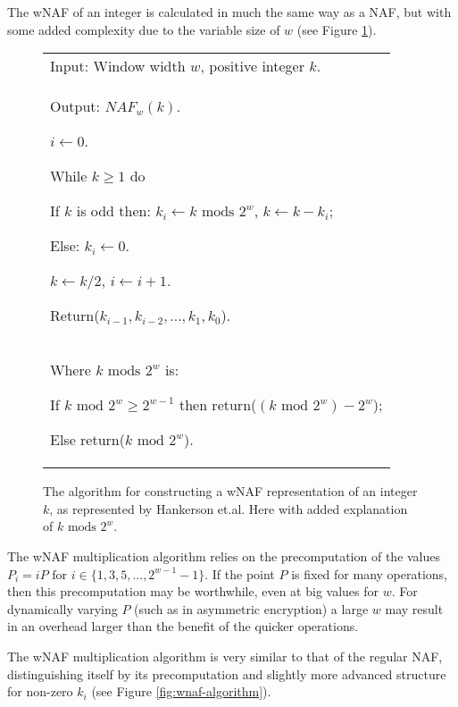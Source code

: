 The wNAF of an integer is calculated in much the same way as a NAF, but with some added complexity due to the variable size of \(w\)
(see Figure \ref{fig:compute-wnaf-algorithm}).

\begin{figure}[htb!]
	\begin{tabular}{|p{\textwidth}|}
		\hline
		Input: Window width \(w\), positive integer \(k\). \\
		Output: \(NAF_w(k)\).
		\begin{enumerate*}
			\item \(i \gets 0\).
			\item While \(k \geq 1\) do
			\begin{enumerate*}
				\item If \(k\) is odd then: \(k_i \gets k \text{ mods } 2^w\), \(k \gets k - k_i\);
				\item Else: \(k_i \gets 0\).
				\item \(k \gets k/2\), \(i \gets i + 1\).
			\end{enumerate*}
			\item Return(\(k_{i-1},k_{i-2},...,k_1,k_0\)).
		\end{enumerate*} \\
		\hline
		Where \(k \text{ mods } 2^w\) is: 
		\begin{enumerate*}
			\item If \(k \text{ mod } 2^w \geq 2^{w-1}\) then return(\((k \text{ mod } 2^w) - 2^w\));
			\item Else return(\(k \text{ mod } 2^w\)).
		\end{enumerate*} \\
		\hline
	\end{tabular}
	\caption{The algorithm for constructing a wNAF representation of an integer \(k\), as represented by Hankerson
		et.al.\cite{hankerson2010} Here with added explanation of \(k \text{ mods } 2^w\).}
	\label{fig:compute-wnaf-algorithm}
\end{figure}

The wNAF multiplication algorithm relies on the precomputation of the values \(P_i = iP \text{ for } i \in \{1,3,5,...,2^{w-1}-1\}\). If the
point \(P\) is fixed for many operations, then this precomputation may be worthwhile, even at big values for \(w\). For dynamically varying
\(P\) (such as in asymmetric encryption) a large \(w\) may result in an overhead larger than the benefit of the quicker operations.

The wNAF multiplication algorithm is very similar to that of the regular NAF, distinguishing itself by its precomputation and slightly more
advanced structure for non-zero \(k_i\) (see Figure \ref{fig:wnaf-algorithm}).

